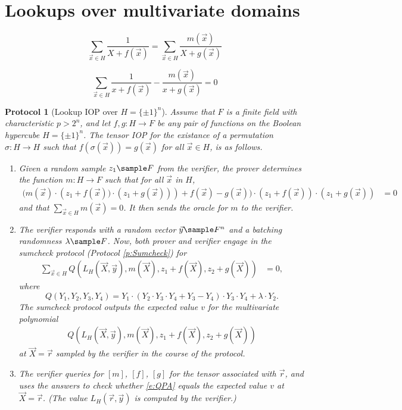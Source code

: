 \documentclass[11pt]{article}
\newtheorem{protocol}[]{Protocol}
\theoremstyle{definition}
\theoremstyle{remark}
\begin{document}
\section{Lookups over multivariate domains}

\[
\sum_{\vec x\in H} \frac{1}{X + f(\vec x)} = \sum_{\vec x\in H} \frac{m(\vec x)}{X + g(\vec x)}  
\]


\[
\sum_{\vec x\in H} \frac{1}{x + f(\vec x)} - \frac{m(\vec x)}{x + g(\vec x)} = 0  
\]


\begin{protocol}[Lookup IOP over $H=\{\pm 1\}^n$]
\label{prot:PA}
Assume that $F$ is a finite field with characteristic $p > 2^n$, and let $f,g :H\rightarrow F$ be any pair of functions on the Boolean hypercube $H=\{\pm 1\}^n$.
The tensor IOP for the existance of a permutation $\sigma: H\longrightarrow H$ such that $f(\sigma(\vec x))=g(\vec x)$ for all $\vec x\in H$,
 is as follows.
\begin{enumerate} 
\item
\label{i:PAstep1}
Given a random sample $z_1 \sample F$ from the verifier, the prover determines the function $m:H\rightarrow F$ such that for all $\vec x$ in $H$,
\begin{align} 
\label{e:m}
	\Big(m(\vec x)\cdot \left(z_1 + f(\vec x))\cdot (z_1 + g(\vec x)) \right) + f(\vec x) - g(\vec x)\Big)\cdot  (z_1 + f(\vec x))\cdot (z_1 + g(\vec x)) &= 0
\end{align}
and that $\sum_{\vec x\in H} m(\vec x) = 0$.
It then sends the oracle for $m$ to the verifier.

\item
\label{i:PAstep2}
The verifier responds with a random vector $\vec y \sample F^n$ and a batching randomness $\lambda\sample F$.
Now, both prover and verifier engage in the sumcheck protocol (Protocol \ref{p:Sumcheck}) for 
\begin{align} 
\label{e:sumcheckm}
	\sum_{\vec x \in H} Q(L_H(\vec X, \vec y), m(\vec X),  z_1 + f(\vec X),  z_2 + g(\vec X))&= 0,
\end{align}
where 
\begin{equation*}
Q(Y_1 , Y_2, Y_3, Y_4) =   
Y_1 \cdot  \left(Y_2\cdot Y_3\cdot Y_4 + Y_3 - Y_4\right)\cdot  Y_3 \cdot Y_4 +  \lambda \cdot Y_2.
\end{equation*}
The sumcheck protocol outputs the expected value $v$ for the multivariate polynomial 
\begin{equation}
\label{e:QPA}
\begin{aligned}
Q(L_H(\vec X, \vec y), m(\vec X), z_1 + f(\vec X),  z_2 + g(\vec X))
\end{aligned}
\end{equation}
at $\vec X=\vec r$ sampled by the verifier in the course of the protocol.

\item
The verifier queries for  $[m]$, $[f]$, $[g]$ for the tensor associated with $\vec r$, and uses the answers 
to check whether \eqref{e:QPA} equals the expected value $v$ at $\vec X = \vec r$. 
(The value $L_H(\vec r, \vec y)$ is computed by the verifier.)
\end{enumerate}
\end{protocol}
\end{document}
